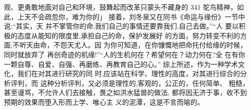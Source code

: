 观、更勇敢地面对自己和环境，鼓舞起而改革只蒙头不藏身的
 341 
鸵鸟精神，如此，上天不会疏忽你，难为你的」
接着，刘冬泉又在同书《命运与缘份》一节中说:“其实，天
并不掌管你的命,我们自己的事情还要靠我们.自己去做。”“人
要以积极的态度从能知的限度里,承担自己的命，保护发展好
的方面，努力转变不利的方面,不听天由命，不怨天尤人。因
为你可知道，在你慷慨地把命托付给缘的时候，同时就放弃了
再创奇迹的机缘!”“人的生机何在？希望何在？动力何在?全
在有你一颗自尊、自爱、自强、再磨练、再教育自己的心。”
综上所述，作为一种学术文化，我们在对其进行研究的同
时,应该站在科学、理性的高度，对其进行综合的分析评判，而
这种分析评判，又必须是理性的,客观的，公正的，任何简单、
粗糙，甚至谩骂，不允许人们去接触，畏之如洪水猛兽的做法,
都将因无济于事，收不到预期的效果而堕入形而上学、唯心主
义的泥潭，这是不言而喻的。
